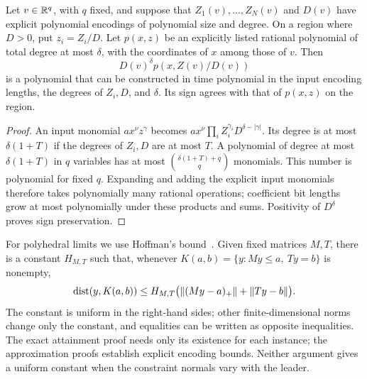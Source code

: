 \begin{samepage}
\begin{lemma}\label{lem:substitution}
Let $v\in\mathbb R^q$, with $q$ fixed, and suppose that $Z_1(v),\ldots,Z_N(v)$
and $D(v)$ have explicit polynomial encodings of polynomial size and degree.
On a region where $D>0$, put $z_i=Z_i/D$. Let $p(x,z)$ be an explicitly
listed rational polynomial of total degree at most $\delta$, with the
coordinates of $x$ among those of $v$. Then
\[
             D(v)^\delta p(x,Z(v)/D(v))
\]
is a polynomial that can be constructed in time polynomial in the input
encoding lengths, the degrees of $Z_i,D$, and $\delta$. Its sign agrees
with that of $p(x,z)$ on the region.
\end{lemma}
\end{samepage}
\begin{proof}
An input monomial $a x^\nu z^\gamma$ becomes
$a x^\nu\prod_iZ_i^{\gamma_i}D^{\delta-|\gamma|}$.
Its degree is at most $\delta(1+T)$ if the degrees of $Z_i,D$ are at
most $T$. A polynomial of degree at most $\delta(1+T)$ in $q$ variables
has at most $\binom{\delta(1+T)+q}{q}$ monomials. This number is
polynomial for fixed $q$. Expanding and adding the explicit input
monomials therefore takes polynomially many rational operations;
coefficient bit lengths grow at most polynomially under these products
and sums. Positivity of $D^\delta$ proves sign preservation.
\end{proof}

For polyhedral limits we use Hoffman's bound~\cite{Hoffman1952}.
Given fixed matrices $M,T$, there is a constant $H_{M,T}$ such that,
whenever $K(a,b)=\{y:My\le a,\ Ty=b\}$ is nonempty,
\begin{equation}\label{eq:hoffman}
 \operatorname{dist}(y,K(a,b))\le H_{M,T}
          \bigl(\left\lVert(My-a)_+\right\rVert+\left\lVert Ty-b\right\rVert\bigr).
\end{equation}
The constant is uniform in the right-hand sides; other finite-dimensional
norms change only the constant, and equalities can be written as opposite
inequalities. The exact attainment proof needs only its existence for each
instance; the approximation proofs establish explicit encoding bounds. Neither argument gives a
uniform constant when the constraint normals vary with the leader.
